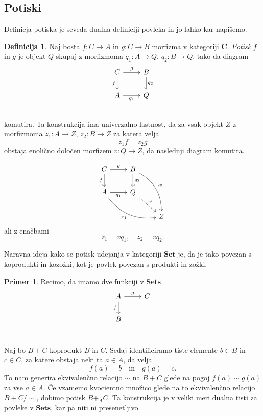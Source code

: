\documentclass[12pt,a4paper]{book}
\theoremstyle{definition}
\newtheorem{definicija}{Definicija}[chapter]
\theoremstyle{plain}
\theoremstyle{definition}
\newtheorem{primer}{Primer}[section]
\theoremstyle{remark}
\newcommand{\cat}[1]{\textbf{#1}}
\begin{document}
\subsection{Potiski}

Definicja potiska je seveda dualna definiciji povleka in jo lahko kar napišemo.

\begin{definicija}
Naj bosta $f: C \to A$ in $g : C \to B$ morfizma v kategoriji $\cat{C}$. \emph{Potisk} $f$ in $g$ je objekt $Q$ skupaj z morfizmoma $q_1 : A \to Q$, $q_2 : B \to Q$, tako da diagram
$$\begin{tikzcd}
C \ar[r, "g"] \ar[d, "f"'] & B \ar[d, "q_2"] \\
A \ar[r, "q_1"'] & Q \\
\end{tikzcd}$$
komutira. Ta konstrukcija ima univerzalno lastnost, da za vsak objekt $Z$ z morfizmoma $z_1 : A \to Z$, $z_2 : B \to Z$ za katera velja $$z_1f = z_2g$$
obstaja enolično določen morfizem $v : Q \to Z$, da naslednji diagram komutira.

$$\begin{tikzcd}
C \ar[r, "g"] \ar[d, "f"'] & B \ar[d, "q_2"] \ar[ddr, bend left, "z_2"] & \\
A \ar[r, "q_1"'] \ar[drr, bend right, "z_1"'] & Q \ar[dr, dashed, "v"] & \\
& & Z 
\end{tikzcd}$$
ali z enačbami $$z_1 = v q_1, \quad z_2 = v q_2.$$
\end{definicija}

Naravna ideja kako se potisk udejanja v kategoriji $\cat{Set}$ je, da je tako povezan s koprodukti in kozožki, kot je povlek povezan s produkti in zožki.

\begin{primer}
Recimo, da imamo dve funkciji v \cat{Sets}
$$ \begin{tikzcd}
A \ar[d, "f"'] \ar[r, "g"] & C \\
B & \\
\end{tikzcd} $$

Naj bo $B + C$ koprodukt $B$ in $C$. Sedaj identificiramo tiste elemente $b \in B$ in $c \in C$, za katere obstaja neki ta $a \in A$, da velja
$$f(a) = b \quad \text{in} \quad g(a) = c.$$
To nam generira ekvivalenčno relacijo $\sim$ na $B + C$ glede na pogoj $f(a) \sim g(a)$ za vse $a \in A$. Če vzamemo kvocientno množico glede na to ekvivalenčno relacijo $B + C/\sim$, dobimo potisk $B +_A C$. Ta konstrukcija je v veliki meri dualna tisti za povleke v $\cat{Sets}$, kar pa niti ni presenetljivo.

\end{primer}
\end{document}
